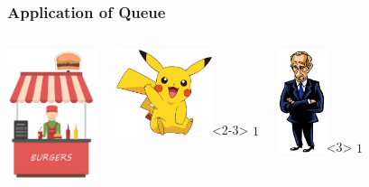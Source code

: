 \begin{frame}
\frametitle{Application of Queue}

\begin{columns}
    \includegraphics[height=3.8cm]{Image/Burger_Stall.jpg}
  \begin{center}
    \includegraphics[height=2.5cm]{Image/pikachu.jpg}<2-3>
    $1$
  \end{center}
    \begin{center}
      \includegraphics[height=3.0cm]{Image/putin.jpg}<3>
      $1$
    \end{center}

  \end{columns}

\end{frame}

